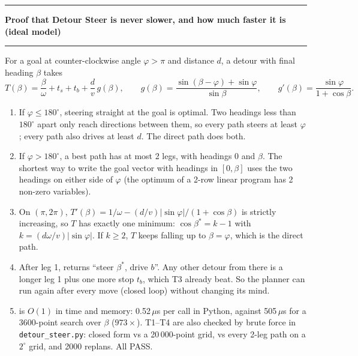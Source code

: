 \documentclass[11pt,a4paper]{article}
\begin{document}
\newpage
\noindent\rule{\linewidth}{1.1pt}\par\vspace{1.4mm}
\noindent\textbf{Proof that Detour Steer is never slower, and how much faster it is (ideal model)}\par\vspace{1.4mm}
\noindent\rule{\linewidth}{0.5pt}\par\vspace{1mm}
{\small
\noindent For a goal at counter-clockwise angle $\varphi > \pi$ and distance $d$, a detour with final heading $\beta$ takes
\[
  T(\beta) = \frac{\beta}{\omega} + t_s + t_b + \frac{d}{v}\,g(\beta), \qquad
  g(\beta) = \frac{\sin(\beta-\varphi) + \sin\varphi}{\sin\beta}, \qquad
  g'(\beta) = \frac{\sin\varphi}{1 + \cos\beta}.
\]
\begin{enumerate}\setlength\itemsep{0.4mm}
\item[\textbf{T1.}] If $\varphi \le 180^\circ$, steering straight at the goal is optimal. Two headings less than
  $180^\circ$ apart only reach directions between them, so every path steers at least $\varphi$; every path
  also drives at least $d$. The direct path does both.
\item[\textbf{T2.}] If $\varphi > 180^\circ$, a best path has at most 2 legs, with headings $0$ and $\beta$.
  The shortest way to write the goal vector with headings in $[0, \beta]$ uses the two headings on either
  side of $\varphi$ (the optimum of a 2-row linear program has 2 non-zero variables).
\item[\textbf{T3.}] On $(\pi, 2\pi)$, $T'(\beta) = 1/\omega - (d/v)\lvert\sin\varphi\rvert/(1+\cos\beta)$ is strictly
  increasing, so $T$ has exactly one minimum: $\cos\beta^\ast = k - 1$ with $k = (d\omega/v)\lvert\sin\varphi\rvert$.
  If $k \ge 2$, $T$ keeps falling up to $\beta = \varphi$, which is the direct path.
\item[\textbf{T4.}] After leg 1,  returns ``steer $\beta^\ast$, drive $b$''. Any other
  detour from there is a longer leg 1 plus one more stop $t_b$, which T3 already beat. So the planner can
  run again after every move (closed loop) without changing its mind.
\item[\textbf{O.}] \FPlan{} is $O(1)$ in time and memory: 0.52\,$\mu$s per call in Python, against 505\,$\mu$s
  for a 3600-point search over $\beta$ ($973\times$). T1--T4 are also checked by brute force in
  \texttt{detour\_steer.py}: closed form vs a 20\,000-point grid, vs every 2-leg path on a
  $2^\circ$ grid, and 2000 replans. All PASS.
\end{enumerate}

}
\end{document}
